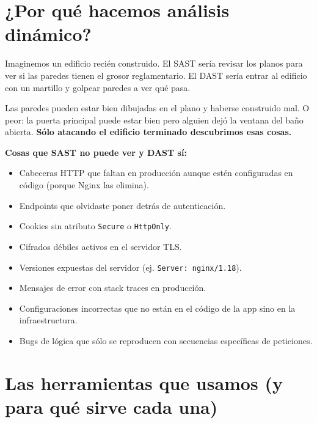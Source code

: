 \documentclass[12pt,a4paper,oneside]{article}
\begin{document}
\section{¿Por qué hacemos análisis dinámico?}

Imaginemos un edificio recién construido. El SAST sería revisar los planos para ver si las paredes tienen el grosor reglamentario. El DAST sería entrar al edificio con un martillo y golpear paredes a ver qué pasa.

Las paredes pueden estar bien dibujadas en el plano y haberse construido mal. O peor: la puerta principal puede estar bien pero alguien dejó la ventana del baño abierta. \textbf{Sólo atacando el edificio terminado descubrimos esas cosas.}

\textbf{Cosas que SAST no puede ver y DAST sí:}
\begin{itemize}[leftmargin=*]
  \item Cabeceras HTTP que faltan en producción aunque estén configuradas en código (porque Nginx las elimina).
  \item Endpoints que olvidaste poner detrás de autenticación.
  \item Cookies sin atributo \texttt{Secure} o \texttt{HttpOnly}.
  \item Cifrados débiles activos en el servidor TLS.
  \item Versiones expuestas del servidor (ej. \texttt{Server: nginx/1.18}).
  \item Mensajes de error con stack traces en producción.
  \item Configuraciones incorrectas que no están en el código de la app sino en la infraestructura.
  \item Bugs de lógica que sólo se reproducen con secuencias específicas de peticiones.
\end{itemize}

\section{Las herramientas que usamos (y para qué sirve cada una)}
\end{document}
